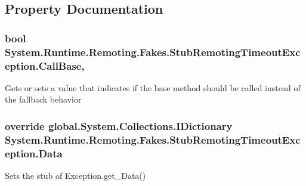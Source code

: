 \subsection{Property Documentation}
\hypertarget{class_system_1_1_runtime_1_1_remoting_1_1_fakes_1_1_stub_remoting_timeout_exception_a601417ba14857dc25de1f1611a5088cb}{
\subsubsection[{Call\-Base}]{\setlength{\rightskip}{0pt plus 5cm}bool System.\-Runtime.\-Remoting.\-Fakes.\-Stub\-Remoting\-Timeout\-Exception.\-Call\-Base\hspace{0.3cm}{\ttfamily [get]}, {\ttfamily [set]}}}\label{class_system_1_1_runtime_1_1_remoting_1_1_fakes_1_1_stub_remoting_timeout_exception_a601417ba14857dc25de1f1611a5088cb}


Gets or sets a value that indicates if the base method should be called instead of the fallback behavior

\hypertarget{class_system_1_1_runtime_1_1_remoting_1_1_fakes_1_1_stub_remoting_timeout_exception_a823f00ae8c8467088654bad65f4b4a3f}{
\subsubsection[{Data}]{\setlength{\rightskip}{0pt plus 5cm}override global.\-System.\-Collections.\-I\-Dictionary System.\-Runtime.\-Remoting.\-Fakes.\-Stub\-Remoting\-Timeout\-Exception.\-Data\hspace{0.3cm}{\ttfamily [get]}}}\label{class_system_1_1_runtime_1_1_remoting_1_1_fakes_1_1_stub_remoting_timeout_exception_a823f00ae8c8467088654bad65f4b4a3f}


Sets the stub of Exception.\-get\-\_\-\-Data()

